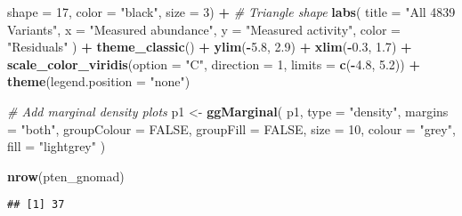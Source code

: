 \documentclass[
]{article}
\newenvironment{Shaded}{\begin{snugshade}}{\end{snugshade}}
\newcommand{\AttributeTok}[1]{\textcolor[rgb]{0.13,0.29,0.53}{#1}}
\newcommand{\CommentTok}[1]{\textcolor[rgb]{0.56,0.35,0.01}{\textit{#1}}}
\newcommand{\ConstantTok}[1]{\textcolor[rgb]{0.56,0.35,0.01}{#1}}
\newcommand{\DecValTok}[1]{\textcolor[rgb]{0.00,0.00,0.81}{#1}}
\newcommand{\FloatTok}[1]{\textcolor[rgb]{0.00,0.00,0.81}{#1}}
\newcommand{\FunctionTok}[1]{\textcolor[rgb]{0.13,0.29,0.53}{\textbf{#1}}}
\newcommand{\NormalTok}[1]{#1}
\newcommand{\OtherTok}[1]{\textcolor[rgb]{0.56,0.35,0.01}{#1}}
\newcommand{\SpecialCharTok}[1]{\textcolor[rgb]{0.81,0.36,0.00}{\textbf{#1}}}
\newcommand{\StringTok}[1]{\textcolor[rgb]{0.31,0.60,0.02}{#1}}
\begin{document}
\begin{Shaded}
\begin{Highlighting}[]
             \AttributeTok{shape =} \DecValTok{17}\NormalTok{, }\AttributeTok{color =} \StringTok{"black"}\NormalTok{, }\AttributeTok{size =} \DecValTok{3}\NormalTok{) }\SpecialCharTok{+}  \CommentTok{\# Triangle shape}
  \FunctionTok{labs}\NormalTok{(}
    \AttributeTok{title =} \StringTok{"All 4839 Variants"}\NormalTok{,}
    \AttributeTok{x =} \StringTok{"Measured abundance"}\NormalTok{,}
    \AttributeTok{y =} \StringTok{"Measured activity"}\NormalTok{,}
    \AttributeTok{color =} \StringTok{"Residuals"}
\NormalTok{  ) }\SpecialCharTok{+}
  \FunctionTok{theme\_classic}\NormalTok{() }\SpecialCharTok{+}
  \FunctionTok{ylim}\NormalTok{(}\SpecialCharTok{{-}}\FloatTok{5.8}\NormalTok{, }\FloatTok{2.9}\NormalTok{) }\SpecialCharTok{+} \FunctionTok{xlim}\NormalTok{(}\SpecialCharTok{{-}}\FloatTok{0.3}\NormalTok{, }\FloatTok{1.7}\NormalTok{) }\SpecialCharTok{+}
  \FunctionTok{scale\_color\_viridis}\NormalTok{(}\AttributeTok{option =} \StringTok{"C"}\NormalTok{, }\AttributeTok{direction =} \DecValTok{1}\NormalTok{, }\AttributeTok{limits =} \FunctionTok{c}\NormalTok{(}\SpecialCharTok{{-}}\FloatTok{4.8}\NormalTok{, }\FloatTok{5.2}\NormalTok{)) }\SpecialCharTok{+}
  \FunctionTok{theme}\NormalTok{(}\AttributeTok{legend.position =} \StringTok{"none"}\NormalTok{)}

\CommentTok{\# Add marginal density plots}
\NormalTok{p1 }\OtherTok{\textless{}{-}} \FunctionTok{ggMarginal}\NormalTok{(}
\NormalTok{  p1,}
  \AttributeTok{type =} \StringTok{"density"}\NormalTok{,}
  \AttributeTok{margins =} \StringTok{"both"}\NormalTok{,}
  \AttributeTok{groupColour =} \ConstantTok{FALSE}\NormalTok{,}
  \AttributeTok{groupFill =} \ConstantTok{FALSE}\NormalTok{,}
  \AttributeTok{size =} \DecValTok{10}\NormalTok{,}
  \AttributeTok{colour =} \StringTok{"grey"}\NormalTok{,}
  \AttributeTok{fill =} \StringTok{"lightgrey"}
\NormalTok{)}

\FunctionTok{nrow}\NormalTok{(pten\_gnomad)}
\end{Highlighting}
\end{Shaded}

\begin{verbatim}
## [1] 37
\end{verbatim}
\end{document}

